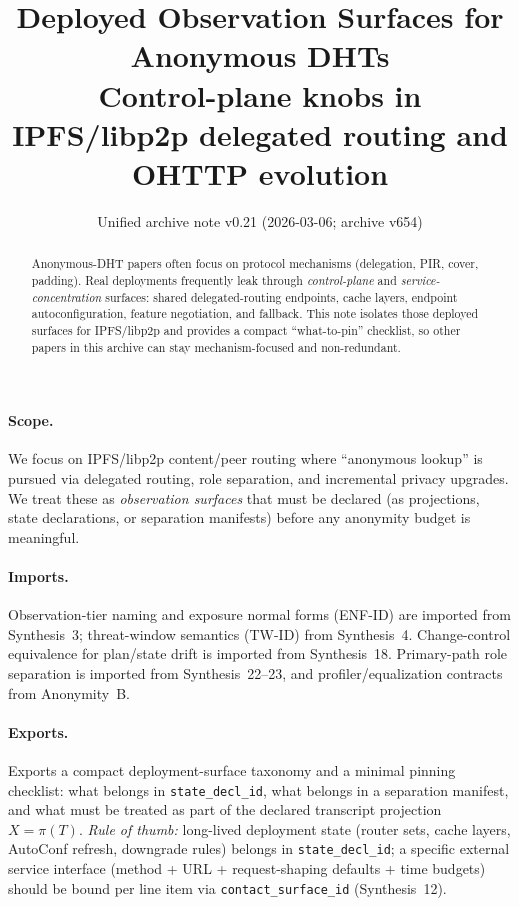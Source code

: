 \documentclass[11pt]{article}
\title{Deployed Observation Surfaces for Anonymous DHTs\\
\large Control-plane knobs in IPFS/libp2p delegated routing and OHTTP evolution}
\author{}
\date{Unified archive note v0.21 (2026-03-06; archive v654)}
\begin{document}
\maketitle

\begin{abstract}
Anonymous-DHT papers often focus on protocol mechanisms (delegation, PIR, cover, padding).
Real deployments frequently leak through \emph{control-plane} and \emph{service-concentration} surfaces: shared delegated-routing endpoints, cache layers, endpoint autoconfiguration, feature negotiation, and fallback.
This note isolates those deployed surfaces for IPFS/libp2p and provides a compact ``what-to-pin'' checklist, so other papers in this archive can stay mechanism-focused and non-redundant.
\end{abstract}

\paragraph{Scope.}
We focus on IPFS/libp2p content/peer routing where ``anonymous lookup'' is pursued via delegated routing, role separation, and incremental privacy upgrades.
We treat these as \emph{observation surfaces} that must be declared (as projections, state declarations, or separation manifests) before any anonymity budget is meaningful.

\paragraph{Imports.}
Observation-tier naming and exposure normal forms (ENF-ID) are imported from Synthesis~3; threat-window semantics (TW-ID) from Synthesis~4.
Change-control equivalence for plan/state drift is imported from Synthesis~18.
Primary-path role separation is imported from Synthesis~22--23, and profiler/equalization contracts from Anonymity~B.
\cite{series:traceifaces,series:threatwindows,series:planstateequiv,series:primarysepmanifest,series:probsep,series:profiling}

\paragraph{Exports.}
Exports a compact deployment-surface taxonomy and a minimal pinning checklist: what belongs in \texttt{state\_decl\_id}, what belongs in a separation manifest, and what must be treated as part of the declared transcript projection $X=\pi(T)$.
\emph{Rule of thumb:} long-lived deployment state (router sets, cache layers, AutoConf refresh, downgrade rules) belongs in \texttt{state\_decl\_id}; a specific external service interface (method + URL + request-shaping defaults + time budgets) should be bound per line item via \texttt{contact\_surface\_id} (Synthesis~12).\cite{series:receiptitems}
\end{document}
